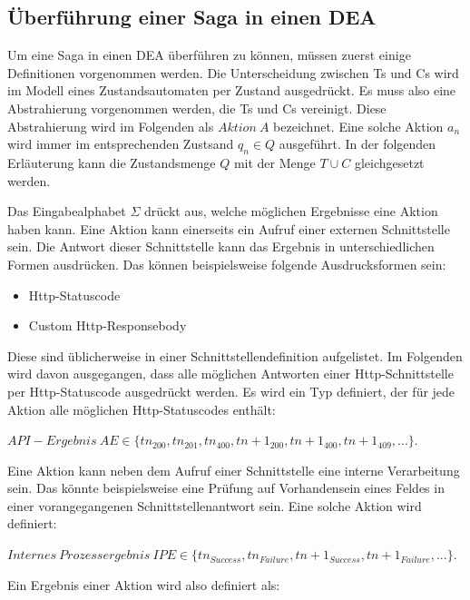 \subsection{Überführung einer Saga in einen DEA}
Um eine Saga in einen DEA überführen zu können, müssen zuerst einige Definitionen vorgenommen werden. Die Unterscheidung zwischen Ts und Cs wird im Modell eines Zustandsautomaten per Zustand ausgedrückt. Es muss also eine Abstrahierung vorgenommen werden, die Ts und Cs vereinigt. Diese Abstrahierung wird im Folgenden als $Aktion\ A$ bezeichnet. Eine solche Aktion $a_n$ wird immer im entsprechenden Zustsand $q_n \in Q$ ausgeführt. In der folgenden Erläuterung kann die Zustandsmenge $Q$ mit der Menge $T \cup C$ gleichgesetzt werden.

Das Eingabealphabet $\Sigma$ drückt aus, welche möglichen Ergebnisse eine Aktion haben kann. Eine Aktion kann einerseits ein Aufruf einer externen Schnittstelle sein. Die Antwort dieser Schnittstelle kann das Ergebnis in unterschiedlichen Formen ausdrücken. Das können beispielsweise folgende Ausdrucksformen sein:
\begin{itemize}
	\item Http-Statuscode
	\item Custom Http-Responsebody
\end{itemize}
Diese sind üblicherweise in einer Schnittstellendefinition aufgelistet. Im Folgenden wird davon ausgegangen, dass alle möglichen Antworten einer Http-Schnittstelle per Http-Statuscode ausgedrückt werden. Es wird ein Typ definiert, der für jede Aktion alle möglichen Http-Statuscodes enthält: 

\begin{center}
	$API-Ergebnis\ AE \in \{tn_{200}, tn_{201}, tn_{400}, tn+1_{200}, tn+1_{400}, tn+1_{409}, ...\}$. 
\end{center}

Eine Aktion kann neben dem Aufruf einer Schnittstelle eine interne Verarbeitung sein. Das könnte beispielsweise eine Prüfung auf Vorhandensein eines Feldes in einer vorangegangenen Schnittstellenantwort sein. Eine solche Aktion wird definiert:

\begin{center}
	$Internes\ Prozessergebnis\ IPE \in \{tn_{Success}, tn_{Failure}, tn+1_{Success}, tn+1_{Failure}, ...\}$.
\end{center}

Ein Ergebnis einer Aktion wird also definiert als:

